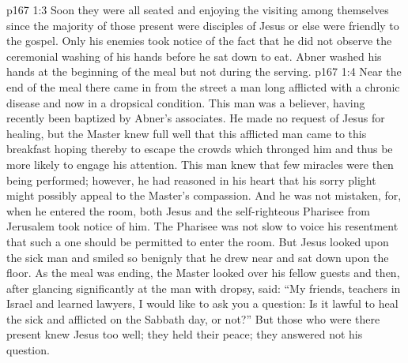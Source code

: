 \vs p167 1:3 Soon they were all seated and enjoying the visiting among themselves since the majority of those present were disciples of Jesus or else were friendly to the gospel. Only his enemies took notice of the fact that he did not observe the ceremonial washing of his hands before he sat down to eat. Abner washed his hands at the beginning of the meal but not during the serving.
\vs p167 1:4 Near the end of the meal there came in from the street a man long afflicted with a chronic disease and now in a dropsical condition. This man was a believer, having recently been baptized by Abner’s associates. He made no request of Jesus for healing, but the Master knew full well that this afflicted man came to this breakfast hoping thereby to escape the crowds which thronged him and thus be more likely to engage his attention. This man knew that few miracles were then being performed; however, he had reasoned in his heart that his sorry plight might possibly appeal to the Master’s compassion. And he was not mistaken, for, when he entered the room, both Jesus and the self\hyp{}righteous Pharisee from Jerusalem took notice of him. The Pharisee was not slow to voice his resentment that such a one should be permitted to enter the room. But Jesus looked upon the sick man and smiled so benignly that he drew near and sat down upon the floor. As the meal was ending, the Master looked over his fellow guests and then, after glancing significantly at the man with dropsy, said: \textcolor{ubdarkred}{“My friends, teachers in Israel and learned lawyers, I would like to ask you a question: Is it lawful to heal the sick and afflicted on the Sabbath day, or not?”} But those who were there present knew Jesus too well; they held their peace; they answered not his question.
